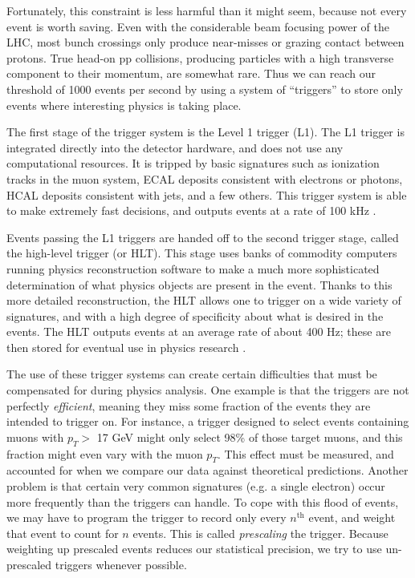 Fortunately, this constraint is less harmful than it might seem,
because not every event is worth saving. Even with the
considerable beam focusing power of the LHC, most bunch crossings only produce
near-misses or grazing contact between protons. True head-on pp
collisions, producing particles with a high transverse component to
their momentum, are somewhat rare. Thus we can reach our threshold of
1000 events per second by using a system of ``triggers'' to store only
events where interesting physics is taking place.

The first stage of the trigger system is the Level 1 trigger
(L1). The L1 trigger is integrated directly into the detector
hardware, and does not use any computational resources. It
is tripped by basic signatures such as ionization tracks in the muon system, ECAL
deposits consistent with electrons or photons, HCAL deposits
consistent with jets, and a few others. This trigger system is able to
make extremely fast decisions, and outputs events at a rate of 100
kHz \cite{trigger}.

Events passing the L1 triggers are handed off to the second trigger
stage, called the high-level trigger (or HLT). This stage uses
banks of commodity computers running physics reconstruction
software to make a much more sophisticated determination of what
physics objects are present in the event. Thanks to this more
detailed reconstruction, the HLT allows one to trigger on a wide
variety of signatures, and with a high degree of specificity about
what is desired in the events. The HLT outputs events at an average
rate of about 400 Hz; these are then stored for eventual use in
physics research \cite{trigger}.

The use of these trigger systems can create certain difficulties
that must be compensated for during physics analysis. One
example is that the triggers are not perfectly \emph{efficient},
meaning they miss some fraction of the events they are intended to
trigger on. For instance, a trigger designed to select events
containing muons with $p_T >$ 17 GeV might only select 98\% of those
target muons, and this fraction might even vary with the muon
$p_T$. This effect must be measured, and accounted for when we compare
our data against theoretical predictions. Another problem is that
certain very common signatures (e.g. a single electron) occur more
frequently than the triggers can handle. To cope with this flood of
events, we may have to program the trigger to record only every
$n^\text{th}$ event, and weight that event to count for $n$
events. This is called \emph{prescaling} the trigger. Because
weighting up prescaled events reduces our statistical precision, we
try to use un-prescaled triggers whenever possible.

